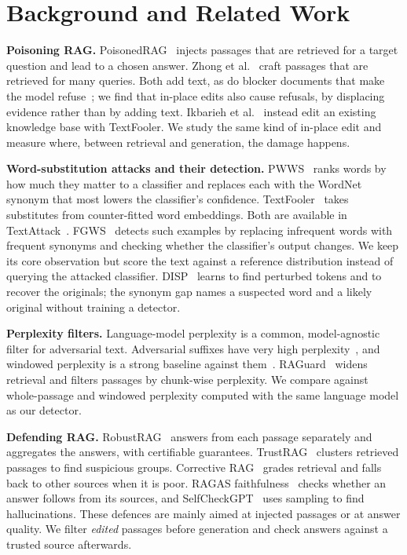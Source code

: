 \documentclass[10pt,journal,compsoc]{IEEEtran}
\begin{document}
\section{Background and Related Work}\label{sec:related}
\textbf{Poisoning RAG.} PoisonedRAG~\cite{zou2025poisonedrag} injects passages that are retrieved for a target question and lead to a chosen answer. Zhong et al.~\cite{zhong2023poisoning} craft passages that are retrieved for many queries. Both add text, as do blocker documents that make the model refuse~\cite{shafran2025jamming}; we find that in-place edits also cause refusals, by displacing evidence rather than by adding text. Ikbarieh et al.~\cite{ikbarieh2025rag} instead edit an existing knowledge base with TextFooler. We study the same kind of in-place edit and measure where, between retrieval and generation, the damage happens.

\textbf{Word-substitution attacks and their detection.} PWWS~\cite{ren2019pwws} ranks words by how much they matter to a classifier and replaces each with the WordNet~\cite{miller1995wordnet} synonym that most lowers the classifier's confidence. TextFooler~\cite{jin2020textfooler} takes substitutes from counter-fitted word embeddings. Both are available in TextAttack~\cite{morris2020textattack}. FGWS~\cite{mozes2021fgws} detects such examples by replacing infrequent words with frequent synonyms and checking whether the classifier's output changes. We keep its core observation but score the text against a reference distribution instead of querying the attacked classifier. DISP~\cite{zhou2019disp} learns to find perturbed tokens and to recover the originals; the synonym gap names a suspected word and a likely original without training a detector.

\textbf{Perplexity filters.} Language-model perplexity is a common, model-agnostic filter for adversarial text. Adversarial suffixes have very high perplexity~\cite{alon2023perplexity}, and windowed perplexity is a strong baseline against them~\cite{jain2023baseline}. RAGuard~\cite{cheng2025raguard} widens retrieval and filters passages by chunk-wise perplexity. We compare against whole-passage and windowed perplexity computed with the same language model as our detector.

\textbf{Defending RAG.} RobustRAG~\cite{xiang2024robustrag} answers from each passage separately and aggregates the answers, with certifiable guarantees. TrustRAG~\cite{zhou2025trustrag} clusters retrieved passages to find suspicious groups. Corrective RAG~\cite{yan2024crag} grades retrieval and falls back to other sources when it is poor. RAGAS faithfulness~\cite{es2024ragas} checks whether an answer follows from its sources, and SelfCheckGPT~\cite{manakul2023selfcheckgpt} uses sampling to find hallucinations. These defences are mainly aimed at injected passages or at answer quality. We filter \emph{edited} passages before generation and check answers against a trusted source afterwards.
\end{document}
